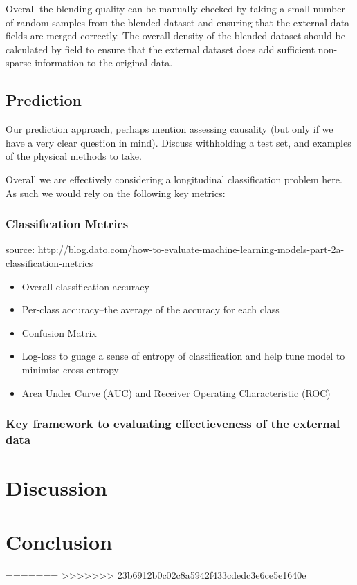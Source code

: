 \documentclass{article}
\begin{document}
\noindent Overall the blending quality can be manually checked by taking 
a small number of random samples from the blended dataset and ensuring that the 
external data fields are merged correctly. The overall density of the blended 
dataset should be calculated by field to ensure that the external dataset does 
add sufficient non-sparse information to the original data.

\subsection{Prediction}

Our prediction approach, perhaps mention assessing causality (but only if we 
have a very clear question in mind). Discuss withholding a test set, and 
examples of the physical methods to take.

\noindent Overall we are effectively considering a longitudinal classification
problem here. As such we would rely on the following key metrics:

\subsubsection{Classification Metrics}
source: \url{http://blog.dato.com/how-to-evaluate-machine-learning-models-part-2a-classification-metrics}
\begin{itemize}
  \item  Overall classification accuracy
  \item  Per-class accuracy--the average of the accuracy for each class
  \item  Confusion Matrix
  \item  Log-loss to guage a sense of entropy of classification and help tune 
         model to minimise cross entropy
  \item  Area Under Curve (AUC) and Receiver Operating Characteristic (ROC)
\end{itemize}

\subsubsection{Key framework to evaluating effectieveness of the external data}

\noindent 


\section{Discussion}

\section{Conclusion}


=======
>>>>>>> 23b6912b0c02c8a5942f433cdedc3e6ce5e1640e
\end{document}
